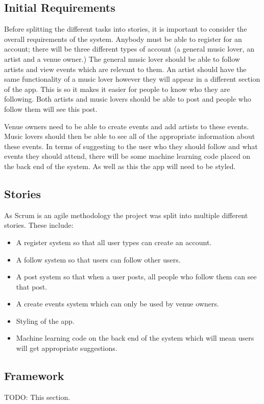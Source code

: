 \subsection{Initial Requirements}
Before splitting the different tasks into stories, it is important to consider the overall requirements of the system. Anybody must be able to register for an account; there will be three different types of account (a general music lover, an artist and a venue owner.) The general music lover should be able to follow artists and view events which are relevant to them. An artist should have the same functionality of a music lover however they will appear in a different section of the app. This is so it makes it easier for people to know who they are following. Both artists and music lovers should be able to post and people who follow them will see this post.

Venue owners need to be able to create events and add artists to these events. Music lovers should then be able to see all of the appropriate information about these events. In terms of suggesting to the user who they should follow and what events they should attend, there will be some machine learning code placed on the back end of the system. As well as this the app will need to be styled.

\subsection{Stories}
As Scrum is an agile methodology the project was split into multiple different stories. These include:
\begin{itemize}
	\item A register system so that all user types can create an account.
	\item A follow system so that users can follow other users.
	\item A post system so that when a user posts, all people who follow them can see that post.
	\item A create events system which can only be used by venue owners.
	\item Styling of the app.
	\item Machine learning code on the back end of the system which will mean users will get appropriate suggestions.
\end{itemize}

\subsection{Framework}
TODO: This section.